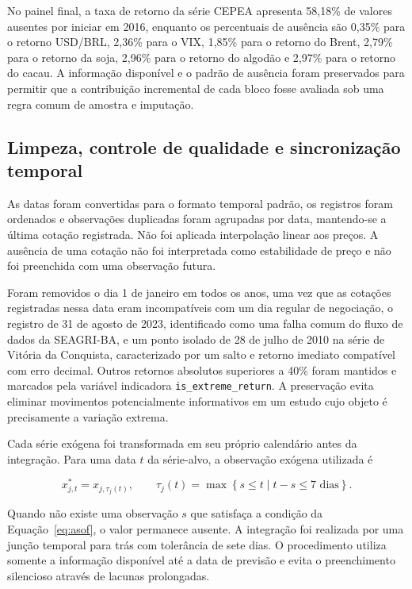 \documentclass[a4paper,fleqn]{cas-sc}
\begin{document}
No painel final, a taxa de retorno da série CEPEA apresenta 58,18\% de valores ausentes por iniciar em 2016, enquanto os percentuais de ausência são 0,35\% para o retorno USD/BRL, 2,36\% para o VIX, 1,85\% para o retorno do Brent, 2,79\% para o retorno da soja, 2,96\% para o retorno do algodão e 2,97\% para o retorno do cacau. A informação disponível e o padrão de ausência foram preservados para permitir que a contribuição incremental de cada bloco fosse avaliada sob uma regra comum de amostra e imputação.

\subsection{Limpeza, controle de qualidade e sincronização temporal}
\label{subsec:data_cleaning}

As datas foram convertidas para o formato temporal padrão, os registros foram ordenados e observações duplicadas foram agrupadas por data, mantendo-se a última cotação registrada. Não foi aplicada interpolação linear aos preços. A ausência de uma cotação não foi interpretada como estabilidade de preço e não foi preenchida com uma observação futura.

Foram removidos o dia 1 de janeiro em todos os anos, uma vez que as cotações registradas nessa data eram incompatíveis com um dia regular de negociação, o registro de 31 de agosto de 2023, identificado como uma falha comum do fluxo de dados da SEAGRI-BA, e um ponto isolado de 28 de julho de 2010 na série de Vitória da Conquista, caracterizado por um salto e retorno imediato compatível com erro decimal. Outros retornos absolutos superiores a 40\% foram mantidos e marcados pela variável indicadora \texttt{is\_extreme\_return}. A preservação evita eliminar movimentos potencialmente informativos em um estudo cujo objeto é precisamente a variação extrema.

Cada série exógena foi transformada em seu próprio calendário antes da integração. Para uma data \(t\) da série-alvo, a observação exógena utilizada é

\begin{equation}
x_{j,t}^{*}=x_{j,\tau_j(t)},
\qquad
\tau_j(t)=\max\left\{s\leq t\;|\;t-s\leq 7\text{ dias}\right\}.
\label{eq:asof}
\end{equation}

Quando não existe uma observação \(s\) que satisfaça a condição da Equação~\ref{eq:asof}, o valor permanece ausente. A integração foi realizada por uma junção temporal para trás com tolerância de sete dias. O procedimento utiliza somente a informação disponível até a data de previsão e evita o preenchimento silencioso através de lacunas prolongadas.
\end{document}
